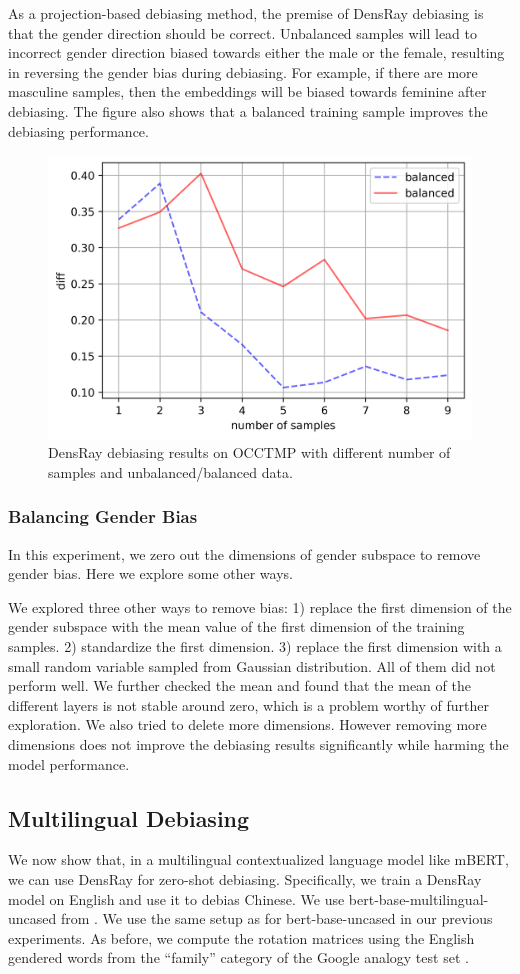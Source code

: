 As a projection-based debiasing method, the premise of DensRay debiasing is that the gender direction should be correct. Unbalanced samples will lead to incorrect gender direction biased towards either the male or the female, resulting in reversing the gender bias during debiasing. For example, if there are more masculine samples, then the embeddings will be biased towards feminine after debiasing. The figure also shows that a balanced training sample improves the debiasing performance.
\begin{figure}[h]
	\centering
	\includegraphics[width=0.5\linewidth]{samples_grid}
	\caption{DensRay debiasing results on OCCTMP with different number of samples and unbalanced/balanced data.}
\end{figure}

\subsubsection{Balancing Gender Bias}
In this experiment, we zero out the dimensions of gender subspace to remove gender bias. Here we explore some other ways.

We explored three other ways to remove bias: 1) replace the first dimension of the gender subspace with the mean value of the first dimension of the training samples. 2) standardize the first dimension. 3) replace the first dimension with a small random variable sampled from Gaussian distribution. All of them did not perform well. We further checked the mean and found that the mean of the different layers is not stable around zero, which is a problem worthy of further exploration. We also tried to delete more dimensions. However removing more dimensions does not improve the debiasing results significantly while harming the model performance.


\subsection{Multilingual Debiasing}
We now show that, in a multilingual contextualized language model like mBERT, we can use DensRay for zero-shot debiasing. Specifically, we train a DensRay model on English and use it to debias Chinese.
We use  bert-base-multilingual-uncased from . We use the same setup as for bert-base-uncased in our previous experiments. As before, we compute the rotation matrices using the English gendered words from the ``family'' category of the Google analogy test set .

